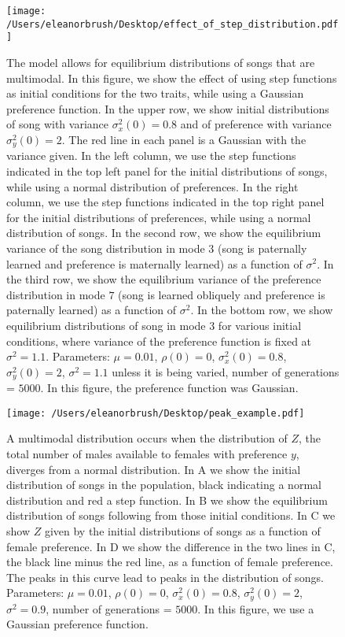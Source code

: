 \documentclass{article}
\begin{document}
\begin{figure}
\texttt{[image: /Users/eleanorbrush/Desktop/effect\_of\_step\_distribution.pdf]}
\caption{\label{effect_of_step_dist}The model allows for equilibrium distributions of songs that are multimodal. In this figure, we show the effect of using step functions as initial conditions for the two traits, while using a Gaussian preference function. In the upper row, we show initial distributions of song with variance $\sigma_x^2(0)=0.8$ and of preference with variance $\sigma_y^2(0)=2$. The red line in each panel is a Gaussian with the variance given. In the left column, we use the step functions indicated in the top left panel for the initial distributions of songs, while using a normal distribution of preferences. In the right column, we use the step functions indicated in the top right panel for the initial distributions of preferences, while using a normal distribution of songs.  In the second row, we show the equilibrium variance of the song distribution in mode $3$ (song is paternally learned and preference is maternally learned) as a function of $\sigma^2$. In the third row, we show the equilibrium variance of the preference distribution in mode $7$ (song is learned obliquely and preference is paternally learned) as a function of $\sigma^2$. In the bottom row, we show equilibrium distributions of song in mode $3$ for various initial conditions, where variance of the preference function is fixed at $\sigma^2=1.1$. Parameters: $\mu=0.01$, $\rho(0)=0$, $\sigma_x^2(0)=0.8$, $\sigma_y^2(0)=2$, $\sigma^2=1.1$ unless it is being varied, number of generations = $5000$. In this figure, the preference function was Gaussian.}
\end{figure}

\begin{figure}
\texttt{[image: /Users/eleanorbrush/Desktop/peak\_example.pdf]}
\caption{\label{peak_example}  A multimodal distribution occurs when the distribution of $Z$, the total number of males available to females with preference $y$, diverges from a normal distribution. In A we show the initial distribution of songs in the population, black indicating a normal distribution and red a step function. In B we show the equilibrium distribution of songs following from those initial conditions. In C we show $Z$ given by the initial distributions of songs as a function of female preference. In D we show the difference in the two lines in C, the black line minus the red line, as a function of female preference. The peaks in this curve lead to peaks in the distribution of songs. Parameters: $\mu=0.01$, $\rho(0)=0$, $\sigma_x^2(0)=0.8$, $\sigma_y^2(0)=2$, $\sigma^2=0.9$, number of generations = $5000$. In this figure, we use a Gaussian preference function. 
}
\end{figure}
\end{document}
